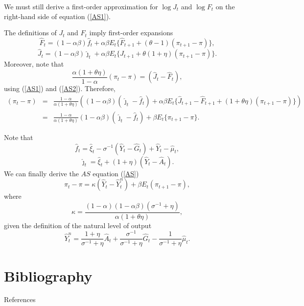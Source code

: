 \documentclass[11pt,aspectratio=169]{beamer}
\begin{document}
\begin{frame}
We must still derive a first-order approximation for $\log J_{t}$ and $\log
F_{t}$ on the right-hand side of equation (\ref{AS1}).

The definitions of $J_{t}$ and $F_{t}$ imply first-order expansions%
\begin{equation}
\hat{F}_{t}=(1-\alpha \beta )\hat{f}_{t}+\alpha \beta E_{t}\{\hat{F}%
_{t+1}+(\theta -1)(\pi _{t+1}-\pi )\},  \label{F}
\end{equation}%
\begin{equation}
\hat{J}_{t}=(1-\alpha \beta )\hat{\jmath}_{t}+\alpha \beta E_{t}\{\hat{J}%
_{t+1}+\theta (1+\eta )(\pi _{t+1}-\pi )\}.  \label{K}
\end{equation}%
Moreover, note that%
\begin{equation}
\frac{\alpha (1+\theta \eta )}{1-\alpha }(\pi _{t}-\pi )=(\hat{J}_{t}-\hat{F}%
_{t}),  \label{R1}
\end{equation}%
using (\ref{AS1}) and (\ref{AS2}). Therefore,%
\begin{eqnarray*}
(\pi _{t}-\pi ) &=&\frac{1-\alpha }{\alpha (1+\theta \eta )}((1-\alpha \beta
)(\hat{\jmath}_{t}-\hat{f}_{t})+\alpha \beta E_{t}\{\hat{J}_{t+1}-\hat{F}%
_{t+1}+(1+\theta \eta )(\pi _{t+1}-\pi )\}) \\
&=&\frac{1-\alpha }{\alpha (1+\theta \eta )}(1-\alpha \beta )(\hat{\jmath}%
_{t}-\hat{f}_{t})+\beta E_{t}\{\pi _{t+1}-\pi \}.
\end{eqnarray*}%
\end{frame}
\begin{frame}
Note that%
\begin{equation*}
\hat{f}_{t}=\hat{\xi}_{t}-\sigma ^{-1}(\hat{Y}_{t}-\hat{G}_{t})+\hat{Y}_{t}-%
\hat{\mu}_{t},
\end{equation*}%
\begin{equation*}
\hat{\jmath}_{t}=\hat{\xi}_{t}+(1+\eta )(\hat{Y}_{t}-\hat{A}_{t}).
\end{equation*}%
We can finally derive the $AS$ equation (\ref{AS}) 
\begin{equation*}
\pi _{t}-\pi =\kappa (\hat{Y}_{t}-\hat{Y}_{t}^{n})+\beta E_{t}(\pi
_{t+1}-\pi ),
\end{equation*}%
where%
\begin{equation*}
\kappa =\frac{(1-\alpha )(1-\alpha \beta )(\sigma ^{-1}+\eta )}{\alpha
(1+\theta \eta )},
\end{equation*}%
given the definition of the natural level of output%
\begin{equation*}
\hat{Y}_{t}^{n}=\frac{1+\eta }{\sigma ^{-1}+\eta }\hat{A}_{t}+\frac{\sigma
^{-1}}{\sigma ^{-1}+\eta }\hat{G}_{t}-\frac{1}{\sigma ^{-1}+\eta }\hat{\mu}%
_{t}.
\end{equation*}

\begin{center}
\hyperlink{LogLinearSystem}{}
\end{center}
\end{frame}

\section{Bibliography}

\begin{frame}[allowframebreaks]{References}
    \printbibliography %
\end{frame}
\end{document}
